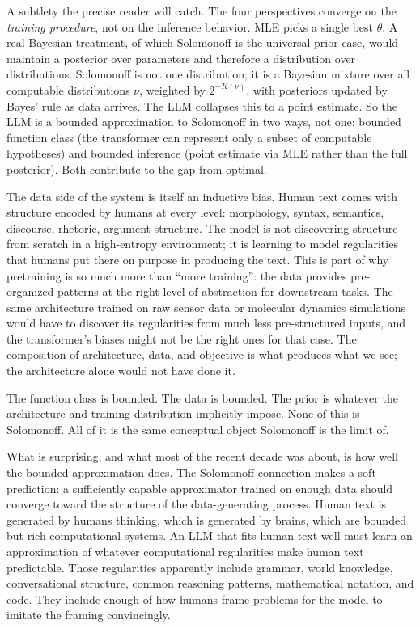 A subtlety the precise reader will catch. The four perspectives converge on the \emph{training procedure}, not on the inference behavior. MLE picks a single best $\theta$. A real Bayesian treatment, of which Solomonoff is the universal-prior case, would maintain a posterior over parameters and therefore a distribution over distributions. Solomonoff is not one distribution; it is a Bayesian mixture over all computable distributions $\nu$, weighted by $2^{-K(\nu)}$, with posteriors updated by Bayes' rule as data arrives. The LLM collapses this to a point estimate. So the LLM is a bounded approximation to Solomonoff in two ways, not one: bounded function class (the transformer can represent only a subset of computable hypotheses) and bounded inference (point estimate via MLE rather than the full posterior). Both contribute to the gap from optimal.

The data side of the system is itself an inductive bias. Human text comes with structure encoded by humans at every level: morphology, syntax, semantics, discourse, rhetoric, argument structure. The model is not discovering structure from scratch in a high-entropy environment; it is learning to model regularities that humans put there on purpose in producing the text. This is part of why pretraining is so much more than ``more training'': the data provides pre-organized patterns at the right level of abstraction for downstream tasks. The same architecture trained on raw sensor data or molecular dynamics simulations would have to discover its regularities from much less pre-structured inputs, and the transformer's biases might not be the right ones for that case. The composition of architecture, data, and objective is what produces what we see; the architecture alone would not have done it.

The function class is bounded. The data is bounded. The prior is whatever the architecture and training distribution implicitly impose. None of this is Solomonoff. All of it is the same conceptual object Solomonoff is the limit of.

What is surprising, and what most of the recent decade was about, is how well the bounded approximation does. The Solomonoff connection makes a soft prediction: a sufficiently capable approximator trained on enough data should converge toward the structure of the data-generating process. Human text is generated by humans thinking, which is generated by brains, which are bounded but rich computational systems. An LLM that fits human text well must learn an approximation of whatever computational regularities make human text predictable. Those regularities apparently include grammar, world knowledge, conversational structure, common reasoning patterns, mathematical notation, and code. They include enough of how humans frame problems for the model to imitate the framing convincingly.

